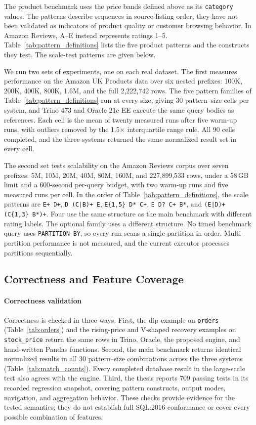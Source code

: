 \documentclass[preprint,12pt,times,a4paper]{elsarticle}
\begin{document}
The product benchmark uses the price bands defined above as its
\texttt{category} values. The patterns describe sequences in source listing
order; they have not been validated as indicators of product quality or
customer browsing behavior. In Amazon Reviews, A--E instead represents
ratings 1--5. Table~\ref{tab:pattern_definitions} lists the five product
patterns and the constructs they test. The scale-test patterns are given
below.

We run two sets of experiments, one on each real dataset. The first measures performance
on the Amazon UK Products data over six nested prefixes: 100K, 200K, 400K,
800K, 1.6M, and the full 2,222,742 rows. The five pattern families of
Table~\ref{tab:pattern_definitions} run at every size, giving 30 pattern--size
cells per system, and Trino 473 and Oracle 21c EE execute the same query bodies
as references. Each cell is the mean of twenty measured runs after five warm-up
runs, with outliers removed by the 1.5$\times$ interquartile range rule. All 90
cells completed, and the three systems returned the same normalized result set
in every cell.

The second set tests scalability on the Amazon Reviews corpus over seven
prefixes: 5M, 10M, 20M, 40M, 80M, 160M, and 227,899,533 rows, under a 58\,GB
limit and a 600-second per-query budget, with two warm-up runs and five
measured runs per cell. In the order of Table~\ref{tab:pattern_definitions},
the scale patterns are \texttt{E+ D+}, \texttt{D (C|B)+ E},
\texttt{E\{1,5\} D* C+}, \texttt{E D? C+ B*}, and
\texttt{(E|D)+ (C\{1,3\} B*)+}. Four use the same structure as the main benchmark with different rating
labels. The optional family uses a different structure. No timed benchmark query
uses \texttt{PARTITION BY}, so every run scans a
single partition in order. Multi-partition performance is not measured, and
the current executor processes partitions sequentially.

\subsection{Correctness and Feature Coverage}

\paragraph{Correctness validation}
Correctness is checked in three ways. First, the dip example on
\texttt{orders} (Table~\ref{tab:orders}) and the rising-price and V-shaped
recovery examples on \texttt{stock\_price} return the same rows in Trino,
Oracle, the proposed engine, and hand-written Pandas functions. Second, the
main benchmark returns identical normalized results in all 30 pattern--size
combinations across the three systems (Table~\ref{tab:match_counts}). Every
completed database result in the large-scale test also agrees with the engine.
Third, the thesis reports 709 passing tests in its recorded regression snapshot, covering
pattern constructs, output modes, navigation, and aggregation
behavior.
These checks provide evidence for the tested semantics; they do not establish
full SQL:2016 conformance or cover every possible combination of features.
\end{document}
